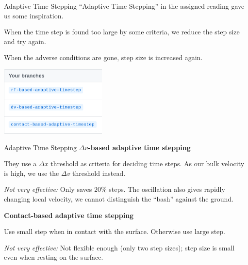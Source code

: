 \documentclass{beamer}
\begin{document}
	\begin{frame}{Adaptive Time Stepping}
		``Adaptive Time Stepping'' in the assigned reading gave us some inspiration.
		
		When the time step is found too large by some criteria, we reduce the step size and try again. 
		
		When the adverse conditions are gone, step size is increased again.
		
		\begin{center}
			\includegraphics[width=0.4\textwidth]{res/branches.png}
		\end{center}
	\end{frame}
	\begin{frame}{Adaptive Time Stepping}
		\textbf{$\Delta v$-based adaptive time stepping}
		
		They use a $\Delta x$ threshold as criteria for deciding time steps. As our bulk velocity is high, we use the $\Delta v$ threshold instead.
		
		\textit{Not very effective:} Only saves $20\%$ steps. The oscillation also gives rapidly changing local velocity, we cannot distinguish the ``bash'' against the ground. 
		
		\textbf{Contact-based adaptive time stepping}
		
		Use small step when in contact with the surface. Otherwise use large step.
		
		\textit{Not very effective:} Not flexible enough (only two step sizes); step size is small even when resting on the surface.
	\end{frame}
\end{document}
